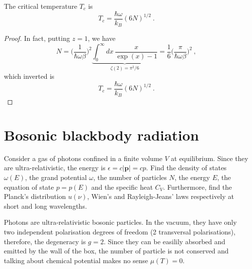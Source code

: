     The critical temperature $T_c$ is 
    \begin{equation*}
            T_c = \frac{\hbar \omega}{k_B} (6N)^{1/2} ~.
    \end{equation*}
    \begin{proof}
        In fact, putting $z = 1$, we have 
        \begin{equation}
            N = \Big (\frac{1}{\hbar \omega \beta} \Big )^{2} \underbrace{\int_0^\infty d x ~ \frac{x}{\exp (x) - 1} }_{\zeta(2) = \pi^2 / 6} = \frac{1}{6} \Big (\frac{\pi}{\hbar \omega \beta} \Big )^{2} ~,
        \end{equation}
        which inverted is 
        \begin{equation}
            T_c = \frac{\hbar \omega}{k_B} (6N)^{1/2} ~.
        \end{equation}
    \end{proof}

\section{Bosonic blackbody radiation}

    \begin{exercise}
        Consider a gas of photons confined in a finite volume $V$ at equilibrium. Since they are ultra-relativistic, the energy is $\epsilon = c |\mathbf p| = cp$. 
        Find the density of states $\omega(E)$, the grand potential $\omega$, the number of particles $N$, the energy $E$, the equation of state $p = p(E)$ and the specific heat $C_V$. Furthermore, find the Planck's distribution $u(\nu)$, Wien's and Rayleigh-Jeans' laws respectively at short and long  wavelengths.
    \end{exercise}

    Photons are ultra-relativistic bosonic particles. In the vacuum, they have only two independent polarisation degrees of freedom (2 transversal polarisations), therefore, the degeneracy is $g=2$. Since they can be easilily absorbed and emitted by the wall of the box, the number of particle is not conserved and talking about chemical potential makes no sense $\mu (T) = 0$. 


